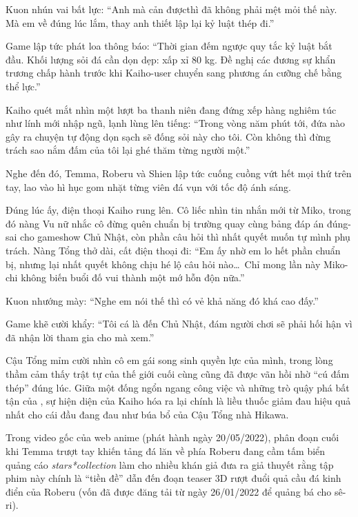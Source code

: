 \documentclass[../main.tex]{subfiles}
\begin{document}
Kuon nhún vai bất lực: ``Anh mà cản đượcthì đã không phải mệt mỏi thế này. Mà em về đúng lúc lắm, thay anh thiết lập lại kỷ luật thép đi.''

Game lập tức phát loa thông báo: ``Thời gian đếm ngược quy tắc kỷ luật bắt đầu. Khối lượng sỏi đá cần dọn dẹp: xấp xỉ 80 kg. Đề nghị các đương sự khẩn trương chấp hành trước khi Kaiho-user chuyển sang phương án cưỡng chế bằng thể lực.''

Kaiho quét mắt nhìn một lượt ba thanh niên đang đứng xếp hàng nghiêm túc như lính mới nhập ngũ, lạnh lùng lên tiếng: ``Trong vòng năm phút tới, đứa nào gây ra chuyện tự động dọn sạch sẽ đống sỏi này cho tôi. Còn không thì đừng trách sao nắm đấm của tôi lại ghé thăm từng người một.''

Nghe đến đó, Temma, Roberu và Shien lập tức cuống cuồng vứt hết mọi thứ trên tay, lao vào hì hục gom nhặt từng viên đá vụn với tốc độ ánh sáng.

Đúng lúc ấy, điện thoại Kaiho rung lên. Cô liếc nhìn tin nhắn mới từ Miko, trong đó nàng Vu nữ nhắc cô đừng quên chuẩn bị trường quay cùng bảng đáp án đúng-sai cho gameshow Chủ Nhật, còn phần câu hỏi thì nhất quyết muốn tự mình phụ trách. Nàng Tổng thở dài, cất điện thoại đi: ``Em ấy nhờ em lo hết phần chuẩn bị, nhưng lại nhất quyết không chịu hé lộ câu hỏi nào\dots\ Chỉ mong lần này Miko-chi không biến buổi đố vui thành một mớ hỗn độn nữa.''

Kuon nhướng mày: ``Nghe em nói thế thì có vẻ khả năng đó khá cao đấy.''

Game khẽ cười khẩy: ``Tôi cá là đến Chủ Nhật, đám người chơi sẽ phải hối hận vì đã nhận lời tham gia cho mà xem.''

Cậu Tổng mỉm cười nhìn cô em gái song sinh quyền lực của mình, trong lòng thầm cảm thấy trật tự của thế giới cuối cùng cũng đã được vãn hồi nhờ ``cú đấm thép'' đúng lúc. Giữa một đống ngổn ngang công việc và những trò quậy phá bất tận của \hls, sự hiện diện của Kaiho hóa ra lại chính là liều thuốc giảm đau hiệu quả nhất cho cái đầu đang đau như búa bổ của Cậu Tổng nhà Hikawa.

\trva

Trong video gốc của web anime (phát hành ngày 20/05/2022), phân đoạn cuối khi Temma trượt tay khiến tảng đá lăn về phía Roberu đang cầm tấm biển quảng cáo \textit{stars*collection} làm cho nhiều khán giả đưa ra giả thuyết rằng tập phim này chính là ``tiền đề'' dẫn đến đoạn teaser 3D rượt đuổi quả cầu đá kinh điển của Roberu (vốn đã được đăng tải từ ngày 26/01/2022 để quảng bá cho sê-ri).
\end{document}

